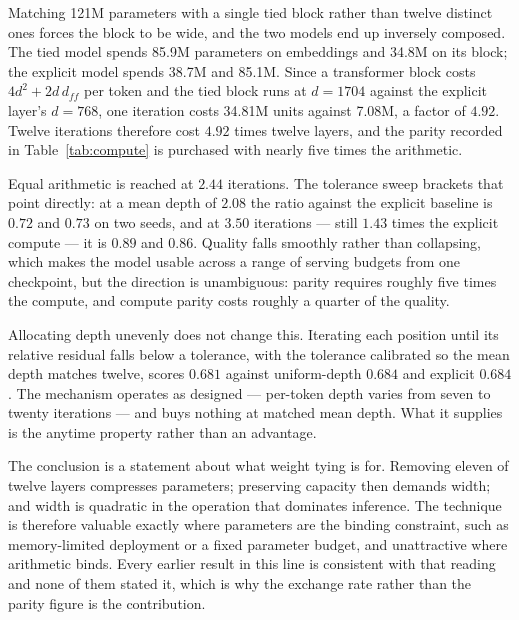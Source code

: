 Matching 121M parameters with a single tied block rather than twelve distinct
ones forces the block to be wide, and the two models end up inversely composed.
The tied model spends 85.9M parameters on embeddings and 34.8M on its block; the
explicit model spends 38.7M and 85.1M. Since a transformer block costs
$4d^2 + 2 d\, d_{ff}$ per token and the tied block runs at $d = 1704$ against the
explicit layer's $d = 768$, one iteration costs 34.81M units against 7.08M, a
factor of $4.92$. Twelve iterations therefore cost $4.92$ times twelve layers,
and the parity recorded in Table~\ref{tab:compute} is purchased with nearly five times the
arithmetic.

Equal arithmetic is reached at $2.44$ iterations. The tolerance sweep brackets
that point directly: at a mean depth of $2.08$ the ratio against the explicit
baseline is $0.72$ and $0.73$ on two seeds, and at $3.50$ iterations --- still
$1.43$ times the explicit compute --- it is $0.89$ and $0.86$. Quality falls
smoothly rather than collapsing, which makes the model usable across a range of
serving budgets from one checkpoint, but the direction is unambiguous: parity
requires roughly five times the compute, and compute parity costs roughly a
quarter of the quality.

Allocating depth unevenly does not change this. Iterating each position until its
relative residual falls below a tolerance, with the tolerance calibrated so the
mean depth matches twelve, scores $0.681$ against uniform-depth $0.684$ and
explicit $0.684$. The mechanism operates as designed --- per-token depth varies
from seven to twenty iterations --- and buys nothing at matched mean depth. What
it supplies is the anytime property rather than an advantage.

The conclusion is a statement about what weight tying is for. Removing eleven of
twelve layers compresses parameters; preserving capacity then demands width; and
width is quadratic in the operation that dominates inference. The technique is
therefore valuable exactly where parameters are the binding constraint, such as
memory-limited deployment or a fixed parameter budget, and unattractive where
arithmetic binds. Every earlier result in this line is consistent with that
reading and none of them stated it, which is why the exchange rate rather than
the parity figure is the contribution.

